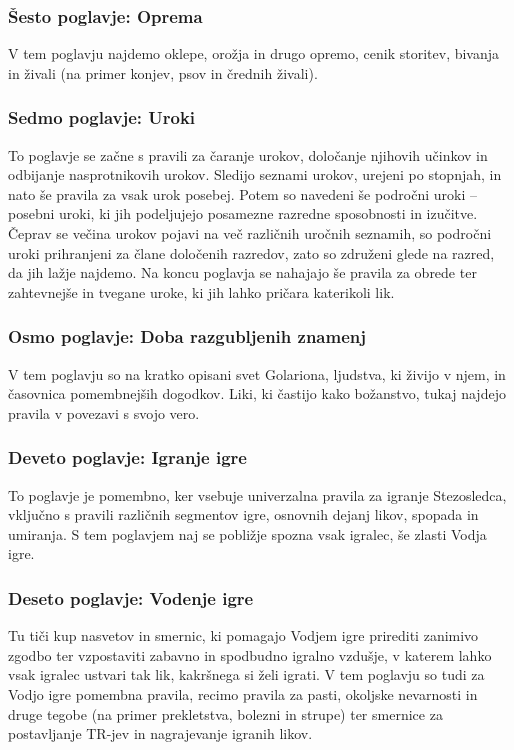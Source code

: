 \subsubsection{Šesto poglavje: Oprema}
V tem poglavju najdemo oklepe, orožja in drugo opremo, cenik storitev, bivanja in živali (na primer konjev, psov in črednih živali).

\subsubsection{Sedmo poglavje: Uroki}
To poglavje se začne s pravili za čaranje urokov, določanje njihovih učinkov in odbijanje nasprotnikovih urokov. Sledijo seznami urokov, urejeni po stopnjah, in nato še pravila za vsak urok posebej. Potem so navedeni še področni uroki -- posebni uroki, ki jih podeljujejo posamezne razredne sposobnosti in izučitve. Čeprav se večina urokov pojavi na več različnih uročnih seznamih, so področni uroki prihranjeni za člane določenih razredov, zato so združeni glede na razred, da jih lažje najdemo. Na koncu poglavja se nahajajo še pravila za obrede ter zahtevnejše in tvegane uroke, ki jih lahko pričara katerikoli lik.

\subsubsection{Osmo poglavje: Doba razgubljenih znamenj}
V tem poglavju so na kratko opisani svet Golariona, ljudstva, ki živijo v njem, in časovnica pomembnejših dogodkov. Liki, ki častijo kako božanstvo, tukaj najdejo pravila v povezavi s svojo vero.

\subsubsection{Deveto poglavje: Igranje igre}
To poglavje je pomembno, ker vsebuje univerzalna pravila za igranje Stezosledca, vključno s pravili različnih segmentov igre, osnovnih dejanj likov, spopada in umiranja. S tem poglavjem naj se pobližje spozna vsak igralec, še zlasti Vodja igre.

\subsubsection{Deseto poglavje: Vodenje igre}
Tu tiči kup nasvetov in smernic, ki pomagajo Vodjem igre prirediti zanimivo zgodbo ter vzpostaviti zabavno in spodbudno igralno vzdušje, v katerem lahko vsak igralec ustvari tak lik, kakršnega si želi igrati. V tem poglavju so tudi za Vodjo igre pomembna pravila, recimo pravila za pasti, okoljske nevarnosti in druge tegobe (na primer prekletstva, bolezni in strupe) ter smernice za postavljanje TR-jev in nagrajevanje igranih likov.

